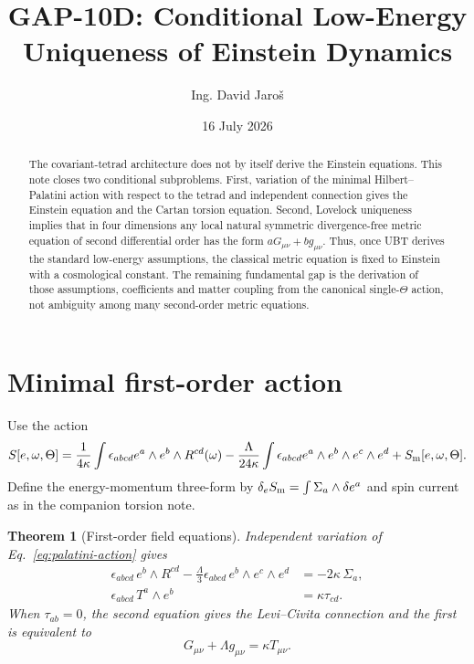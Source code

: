 \documentclass[12pt,a4paper]{article}
\title{GAP-10D: Conditional Low-Energy Uniqueness of Einstein Dynamics}
\author{Ing. David Jaro\v{s}}
\date{16 July 2026}
\newtheorem{theorem}[definition]{Theorem}
\theoremstyle{remark}\newtheorem{remark}[definition]{Remark}
\begin{document}
\maketitle
\UBTProvenanceNotice

\begin{abstract}
The covariant-tetrad architecture does not by itself derive the Einstein
equations.  This note closes two conditional subproblems.  First, variation of
the minimal Hilbert--Palatini action with respect to the tetrad and independent
connection gives the Einstein equation and the Cartan torsion equation.
Second, Lovelock uniqueness implies that in four dimensions any local natural
symmetric divergence-free metric equation of second differential order has
the form $aG_{\mu\nu}+bg_{\mu\nu}$.  Thus, once UBT derives the standard
low-energy assumptions, the classical metric equation is fixed to Einstein
with a cosmological constant.  The remaining fundamental gap is the derivation
of those assumptions, coefficients and matter coupling from the canonical
single-$\Theta$ action, not ambiguity among many second-order metric equations.
\end{abstract}

\section{Minimal first-order action}
Use the action
\begin{equation}
 S[e,\omega,\Theta]
 =\frac{1}{4\kappa}\int\epsilon_{abcd}
 e^a\wedge e^b\wedge R^{cd}(\omega)
 -\frac{\Lambda}{24\kappa}\int\epsilon_{abcd}
 e^a\wedge e^b\wedge e^c\wedge e^d
 +S_{\rm m}[e,\omega,\Theta].
 \label{eq:palatini-action}
\end{equation}
Define the energy-momentum three-form by
$\delta_eS_{\rm m}=\int\Sigma_a\wedge\delta e^a$ and spin current as in the
companion torsion note.

\begin{theorem}[First-order field equations]
Independent variation of Eq.~\eqref{eq:palatini-action} gives
\begin{align}
 \epsilon_{abcd}\,e^b\wedge R^{cd}
 -\frac{\Lambda}{3}\epsilon_{abcd}\,e^b\wedge e^c\wedge e^d
 &= -2\kappa\,\Sigma_a,
 \label{eq:tetrad-eom}\\
 \epsilon_{abcd}\,T^a\wedge e^b&=\kappa\tau_{cd}.
 \label{eq:connection-eom}
\end{align}
When $\tau_{ab}=0$, the second equation gives the Levi--Civita connection and
the first is equivalent to
\begin{equation}
 \boxed{G_{\mu\nu}+\Lambda g_{\mu\nu}=\kappa T_{\mu\nu}.}
 \label{eq:einstein}
\end{equation}
\end{theorem}
\end{document}
